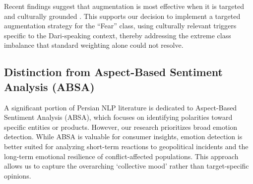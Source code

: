 \documentclass[runningheads]{llncs}
\begin{document}
Recent findings suggest that augmentation is most effective when it is targeted
and culturally grounded \cite{nta2025augmentation}. This supports our decision to implement a targeted
augmentation strategy for the ``Fear'' class, using culturally relevant triggers specific
to the Dari-speaking context, thereby addressing the extreme class imbalance that standard weighting alone could not resolve.
\subsection{Distinction from Aspect-Based Sentiment Analysis (ABSA)}
A significant portion of Persian NLP literature is dedicated to Aspect-Based Sentiment Analysis (ABSA), which focuses on identifying polarities toward specific entities or products. However, our research prioritizes broad emotion detection. While ABSA is valuable for consumer insights, emotion detection is better suited for analyzing short-term reactions to geopolitical incidents and the long-term emotional resilience of conflict-affected populations. This approach allows us to capture the overarching `collective mood' rather than target-specific opinions.
\end{document}
